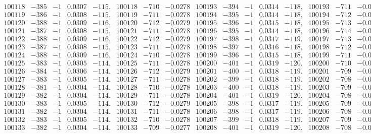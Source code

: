 \documentclass[11pt,reqno,a4letter]{article}
\numberwithin{figure}{section}
\numberwithin{table}{section}
\theoremstyle{plain}
\numberwithin{theorem}{section}
\theoremstyle{definition}
\begin{document}
\begin{table}[ht!]
\begin{equation*}
{\begin{array}{ccccc|ccc||ccccc|ccc}
100118 & -385 & -1 & 0.0307 & -115. & 100118 & -710 & -0.0278 & 100193 & -394 & -1 & 0.0314 & -118. & 100193 & -711 & -0.0278  \\
100119 & -386 & -1 & 0.0308 & -115. & 100119 & -711 & -0.0278 & 100194 & -395 & -1 & 0.0314 & -118. & 100194 & -712 & -0.0278  \\
100120 & -388 & -1 & 0.0309 & -116. & 100120 & -712 & -0.0279 & 100195 & -396 & -1 & 0.0315 & -118. & 100195 & -713 & -0.0279  \\
100121 & -387 & -1 & 0.0308 & -115. & 100121 & -711 & -0.0278 & 100196 & -395 & -1 & 0.0314 & -118. & 100196 & -714 & -0.0279  \\
100122 & -388 & -1 & 0.0309 & -116. & 100122 & -712 & -0.0279 & 100197 & -398 & -1 & 0.0317 & -119. & 100197 & -713 & -0.0279  \\
100123 & -387 & -1 & 0.0308 & -115. & 100123 & -711 & -0.0278 & 100198 & -397 & -1 & 0.0316 & -118. & 100198 & -712 & -0.0278  \\
100124 & -388 & -1 & 0.0309 & -116. & 100124 & -710 & -0.0278 & 100199 & -396 & -1 & 0.0315 & -118. & 100199 & -711 & -0.0278  \\
100125 & -383 & -1 & 0.0305 & -114. & 100125 & -711 & -0.0278 & 100200 & -401 & -1 & 0.0319 & -120. & 100200 & -710 & -0.0278  \\
100126 & -384 & -1 & 0.0306 & -114. & 100126 & -712 & -0.0279 & 100201 & -400 & -1 & 0.0318 & -119. & 100201 & -709 & -0.0277  \\
100127 & -383 & -1 & 0.0305 & -114. & 100127 & -711 & -0.0278 & 100202 & -399 & -1 & 0.0318 & -119. & 100202 & -708 & -0.0277  \\
100128 & -381 & -1 & 0.0304 & -114. & 100128 & -710 & -0.0278 & 100203 & -400 & -1 & 0.0318 & -119. & 100203 & -709 & -0.0277  \\
100129 & -382 & -1 & 0.0304 & -114. & 100129 & -711 & -0.0278 & 100204 & -401 & -1 & 0.0319 & -120. & 100204 & -708 & -0.0277  \\
100130 & -383 & -1 & 0.0305 & -114. & 100130 & -712 & -0.0279 & 100205 & -398 & -1 & 0.0317 & -119. & 100205 & -709 & -0.0277  \\
100131 & -382 & -1 & 0.0304 & -114. & 100131 & -711 & -0.0278 & 100206 & -398 & -1 & 0.0317 & -119. & 100206 & -708 & -0.0277  \\
100132 & -383 & -1 & 0.0305 & -114. & 100132 & -710 & -0.0278 & 100207 & -399 & -1 & 0.0318 & -119. & 100207 & -709 & -0.0277  \\
100133 & -382 & -1 & 0.0304 & -114. & 100133 & -709 & -0.0277 & 100208 & -401 & -1 & 0.0319 & -120. & 100208 & -708 & -0.0277  \\

\end{array}}
\end{equation*}
\end{table}
\end{document}

